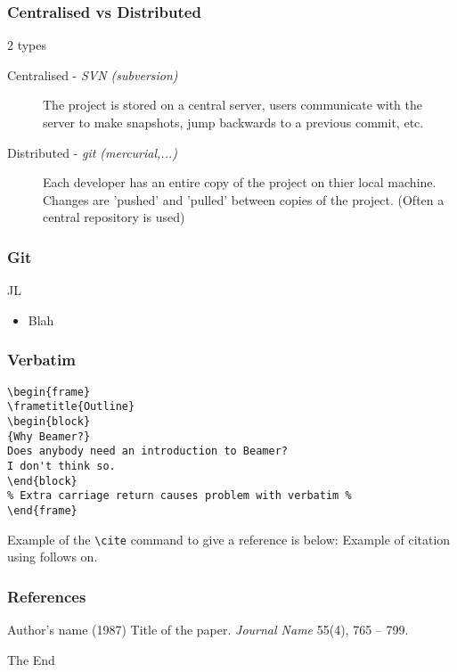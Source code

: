\documentclass{beamer}
\begin{document}
\begin{frame}
\frametitle{Centralised vs Distributed}
\begin{block}
{2 types}
\begin{description}
\item[Centralised - \emph{SVN (subversion)} ] The project is stored on a central server, users communicate with the server to make snapshots, jump backwards to a previous commit, etc.
\item[Distributed - \emph{git (mercurial,...)} ] Each developer has an entire copy of the project on thier local machine. Changes are 'pushed' and 'pulled' between copies of the project. (Often a central repository is used)
\end{description}
\end{block}
\end{frame}
%
\begin{frame}
\frametitle{Git}
\begin{block}{JL}
\begin{itemize}
\item Blah
\end{itemize}
\end{block}
\end{frame}
%
\begin{frame}[fragile] %
\frametitle{Verbatim}
\begin{example}
\begin{verbatim}
\begin{frame}
\frametitle{Outline}
\begin{block}
{Why Beamer?}
Does anybody need an introduction to Beamer?
I don't think so.
\end{block}
% Extra carriage return causes problem with verbatim %
\end{frame}\end{verbatim} 
\end{example}
\end{frame}
 
\begin{frame}[fragile]  %
Example of the \verb|\cite| command to give a reference is below:
Example of citation using \cite{key1} follows on.
\end{frame}
 
\begin{frame}
\frametitle{References}
\footnotesize{
\begin{thebibliography}{99}
  Author's name (1987)
 \newblock Title of the paper.
 \newblock \emph{Journal Name} 55(4), 765 -- 799.
\end{thebibliography}
}
\end{frame}
 
\begin{frame}
\centerline{The End}
\end{frame}
\end{document}
